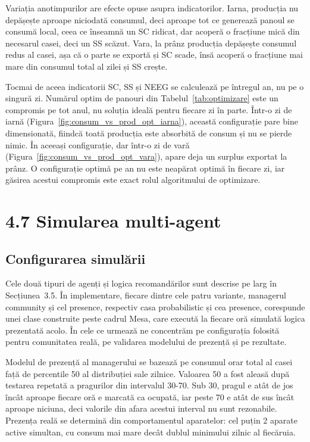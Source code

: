 \documentclass[12pt,a4paper]{report}
\begin{document}
Variația anotimpurilor are efecte opuse asupra indicatorilor. Iarna, producția nu depășește aproape niciodată consumul, deci aproape tot ce generează panoul se consumă local, ceea ce înseamnă un SC ridicat, dar acoperă o fracțiune mică din necesarul casei, deci un SS scăzut. Vara, la prânz producția depășește consumul redus al casei, așa că o parte se exportă și SC scade, însă acoperă o fracțiune mai mare din consumul total al zilei și SS crește.

Tocmai de aceea indicatorii SC, SS și NEEG se calculează pe întregul an, nu pe o singură zi. Numărul optim de panouri din Tabelul~\ref{tab:optimizare} este un compromis pe tot anul, nu soluția ideală pentru fiecare zi în parte. Într-o zi de iarnă (Figura~\ref{fig:consum_vs_prod_opt_iarna}), această configurație pare bine dimensionată, fiindcă toată producția este absorbită de consum și nu se pierde nimic. În aceeași configurație, dar într-o zi de vară (Figura~\ref{fig:consum_vs_prod_opt_vara}), apare deja un surplus exportat la prânz. O configurație optimă pe an nu este neapărat optimă în fiecare zi, iar găsirea acestui compromis este exact rolul algoritmului de optimizare.

\section*{4.7 Simularea multi-agent}

\subsection*{Configurarea simulării}

Cele două tipuri de agenți și logica recomandărilor sunt descrise pe larg în Secțiunea~3.5. În implementare, fiecare dintre cele patru variante, managerul community și cel presence, respectiv casa probabilistic și cea presence, corespunde unei clase construite peste cadrul Mesa, care execută la fiecare oră simulată logica prezentată acolo. În cele ce urmează ne concentrăm pe configurația folosită pentru comunitatea reală, pe validarea modelului de prezență și pe rezultate.

Modelul de prezență al managerului se bazează pe consumul orar total al casei față de percentile 50 al distribuției sale zilnice. Valoarea 50 a fost aleasă după testarea repetată a pragurilor din intervalul 30-70. Sub 30, pragul e atât de jos încât aproape fiecare oră e marcată ca ocupată, iar peste 70 e atât de sus încât aproape niciuna, deci valorile din afara acestui interval nu sunt rezonabile. Prezența reală se determină din comportamentul aparatelor: cel puțin 2 aparate active simultan, cu consum mai mare decât dublul minimului zilnic al fiecăruia.
\end{document}

